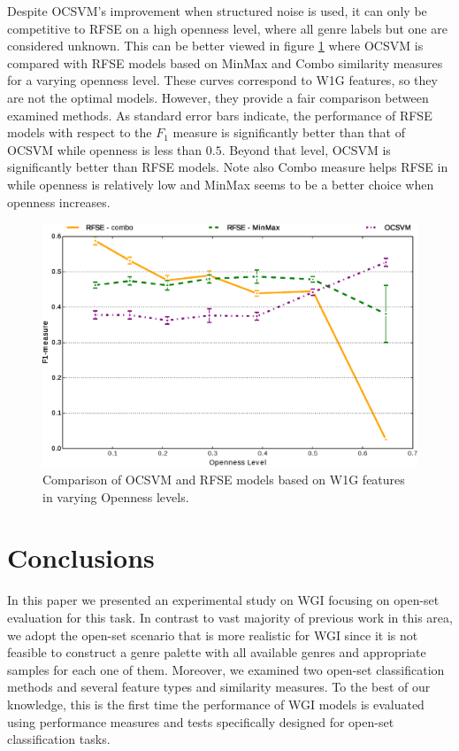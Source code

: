 Despite OCSVM's improvement when structured noise is used, it can only be competitive to RFSE on a high openness level, where all genre labels but one are considered unknown. This can be better viewed in figure \ref{fig:RFSE_vs_OCSVME_W1G_openness_test} where OCSVM is compared with RFSE models based on MinMax and Combo similarity measures for a varying openness level. These curves correspond to W1G features, so they are not the optimal models. However, they provide a fair comparison between examined methods. As standard error bars indicate, the performance of RFSE models with respect to the $F_{1}$ measure is significantly better than that of OCSVM while openness is less than $0.5$. Beyond that level, OCSVM is significantly better than RFSE models. Note also Combo measure helps RFSE in while openness is relatively low and MinMax seems to be a better choice when openness increases.

\begin{figure}[H]
\begin{center}
    \includegraphics[scale=0.38]{diagrams/RFSE_vs_OCSVME_W1G.eps}
	\caption{Comparison of OCSVM and RFSE models based on W1G features in varying Openness levels.}
	\label{fig:RFSE_vs_OCSVME_W1G_openness_test}
\end{center}
\end{figure}

\section{Conclusions}\label{sec:conclusions}

In this paper we presented an experimental study on WGI focusing on open-set evaluation for this task. In contrast to vast majority of previous work in this area, we adopt the open-set scenario that is more realistic for WGI since it is not feasible to construct a genre palette with all available genres and appropriate samples for each one of them. Moreover, we examined two open-set classification methods and several feature types and similarity measures. To the best of our knowledge, this is the first time the performance of WGI models is evaluated using performance measures and tests specifically designed for open-set classification tasks.

